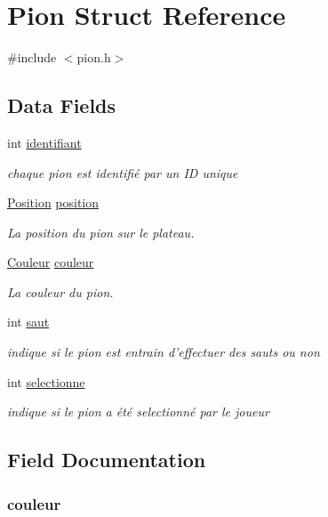 \hypertarget{struct_pion}{\section{Pion Struct Reference}
\label{struct_pion}
}


{\ttfamily \#include $<$pion.\-h$>$}

\subsection*{Data Fields}
\begin{DoxyCompactItemize}
\item 
int \hyperlink{struct_pion_a05af294add88c6f08e066bf37a7a7a4d}{identifiant}
\begin{DoxyCompactList}\small\item\em chaque pion est identifié par un I\-D unique \end{DoxyCompactList}\item 
\hyperlink{struct_position}{Position} \hyperlink{struct_pion_a4d84949a19a29d3bb4dd2635c8241a83}{position}
\begin{DoxyCompactList}\small\item\em La position du pion sur le plateau. \end{DoxyCompactList}\item 
\hyperlink{couleur_8h_aa304d0ca681f782b1d7735da33037dd7}{Couleur} \hyperlink{struct_pion_af0e152d09c13944935e00bef7a3c5111}{couleur}
\begin{DoxyCompactList}\small\item\em La couleur du pion. \end{DoxyCompactList}\item 
int \hyperlink{struct_pion_acc7ca3a448047471c3336a429748dc3f}{saut}
\begin{DoxyCompactList}\small\item\em indique si le pion est entrain d'effectuer des sauts ou non \end{DoxyCompactList}\item 
int \hyperlink{struct_pion_a1121d56f47a88b92bb5510a6ecf36aab}{selectionne}
\begin{DoxyCompactList}\small\item\em indique si le pion a été selectionné par le joueur \end{DoxyCompactList}\end{DoxyCompactItemize}


\subsection{Field Documentation}
\hypertarget{struct_pion_af0e152d09c13944935e00bef7a3c5111}{
\subsubsection[{couleur}]{ couleur}}\label{struct_pion_af0e152d09c13944935e00bef7a3c5111}


